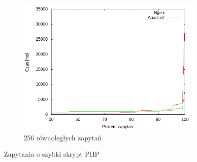 \begin{figure}
\begin{subfigure}[h]{0.3\textwidth}
		\includegraphics[width=\textwidth]{testy/wybor_fib_5_256.png}
		\caption{256 równoległych zapytań}
	\end{subfigure}
	\caption{Zapytania o szybki skrypt PHP}\label{fig:wyb_fib_5}
\end{figure}
